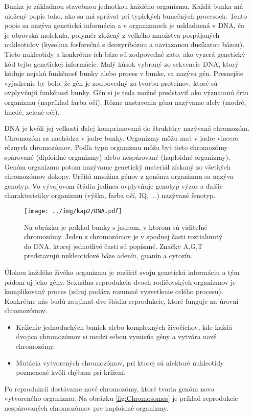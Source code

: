 Bunka je základnou stavebnou jednotkou každého organizmu. Každá bunka má uložený popis toho, ako sa má správať pri typických bunečných procesoch. Tento popis sa nazýva genetická informácia a v organizmoch je uskladnená v DNA, čo je obrovská molekula, polymér zložený z veľkého množstva pospájaných nukleotidov (kyselina fosforečná s deoxyribózou a naviazanou dusíkatou bázou). Tieto nukleotidy a konkrétne ich báze sú zodpovedné zato, ako vyzerá genetický kód tejto genetickej informácie. Malý kúsok vybraný zo sekvencie DNA, ktorý kóduje nejakú funkčnosť bunky alebo proces v bunke, sa nazýva gén. Presnejšie vyjadrenie by bolo, že gén je zodpovedný za tvorbu proteínov, ktoré sú ovplyvňujú funkčnosť bunky. Gén si je teda možné predstaviť ako významnú črtu organizmu (napríklad farba očí). Rôzne nastavenia génu nazývame alely (modré, hnedé, zelené oči).

DNA je kvôli jej veľkosti ďalej komprimovaná do štruktúry nazývaná chromozóm. Chromozóm sa nachádza v jadre bunky. Organizmy môžu mať v jadre viacero rôznych chromozómov. Podľa typu organizmu môžu byť tieto chromozómy spárované (diploidné organizmy) alebo nespárované (haploidné organizmy). Genóm organizmu potom nazývame genetický materiál získaný zo všetkých chromozómov dokopy. Určitá množina génov z genómu organizmu sa nazýva genotyp. Vo vývojovom štádiu jedinca ovplyvňuje genotyp výzor a ďalšie charakteristiky organizmu (výška, farba očí, IQ, ...) nazývané fenotyp.

\begin{figure}[h]
\centering
\centerline{\mbox{\texttt{[image: ../img/kap2/DNA.pdf]}}}
\caption{Na obrázku je príklad bunky s jadrom, v ktorom sú viditeľné chromozómy. Jeden z chromozómov je v spodnej časti roztiahnutý do DNA, ktorej jednotlivé časti sú popísané. Značky A,G,T predstavujú nukleotidové báze adenín, guanín a cytozín.}\label{fig:DNA}
\end{figure}

Úlohou každého živého organizmu je rozšíriť svoju genetickú informáciu a tým pádom aj jeho gény. Sexuálna reprodukcia dvoch rodičovských organizmov je komplikovaný proces (zdroj \cite{online-shuffling} podáva rozumné vysvetlenie celého procesu). Konkrétne nás budú zaujímať dve štádia reprodukcie, ktoré funguje na úrovni chromozómov.
\begin{itemize}
\item Kríženie jednoduchých buniek alebo komplexných živočíchov, kde každá dvojica chromozómov si medzi sebou vymieňa gény a vytvára nové chromozómy.
\item Mutácia vytvorených chromozómov, pri ktorej sú niektoré nukleotidy pozmenené kvôli chýbam pri krížení.
\end{itemize}
Po reprodukcii dostávame nové chromozómy, ktoré tvoria genóm novo vytvoreného organizmu. Na obrázku \ref{fig:Chromosomes} je príklad reprodukcie nespárovaných chromozómov pre haploidné organizmy.

